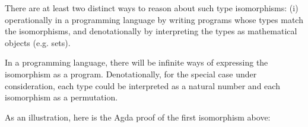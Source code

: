 There are at least two distinct ways to reason about such type isomorphisms: (i)
operationally in a programming language by writing programs whose types match
the isomorphisms, and denotationally by interpreting the types as mathematical
objects (e.g. sets).

In a programming language, there will be infinite ways of
expressing the isomorphism as a program. Denotationally, for the special case
under consideration, each type could be interpreted as a natural number and each
isomorphism as a permutation.


As an illustration, here is the Agda proof of the first isomorphism above:




